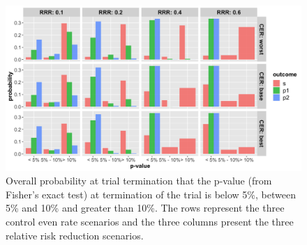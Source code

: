 \documentclass[]{article}
\begin{document}
\begin{figure}
  \caption{Overall probability at trial termination that the p-value (from Fisher’s exact test) at termination of the
  trial is below 5\%, between 5\% and 10\% and greater than 10\%. The rows represent the three control even rate scenarios
  and the three columns present the three relative risk reduction scenarios.}
  \includegraphics{../p1_plots/batch_size_nb_3000/pvalue_p1.png}
\end{figure}
\end{document}
